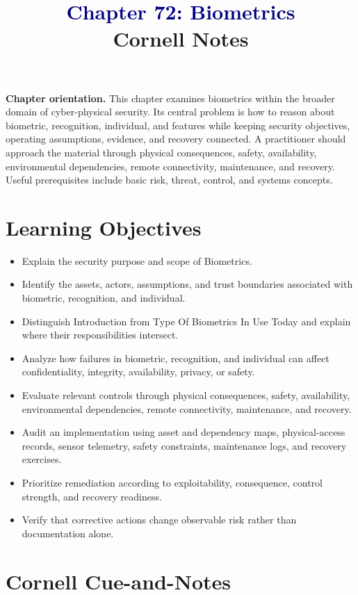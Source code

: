\documentclass[11pt]{article}
\title{\textcolor{Navy}{Chapter 72: Biometrics}\\[2mm]\large Cornell Notes}
\author{}
\date{}
\begin{document}
\maketitle
\thispagestyle{fancy}
\vspace{-1.5em}
\begin{orientationbox}
\textbf{Chapter orientation.} This chapter examines biometrics within the broader domain of cyber-physical security. Its central problem is how to reason about biometric, recognition, individual, and features while keeping security objectives, operating assumptions, evidence, and recovery connected. A practitioner should approach the material through physical consequences, safety, availability, environmental dependencies, remote connectivity, maintenance, and recovery. Useful prerequisites include basic risk, threat, control, and systems concepts.
\end{orientationbox}
\section*{Learning Objectives}
\begin{itemize}
\item Explain the security purpose and scope of Biometrics.
\item Identify the assets, actors, assumptions, and trust boundaries associated with biometric, recognition, and individual.
\item Distinguish Introduction from Type Of Biometrics In Use Today and explain where their responsibilities intersect.
\item Analyze how failures in biometric, recognition, and individual can affect confidentiality, integrity, availability, privacy, or safety.
\item Evaluate relevant controls through physical consequences, safety, availability, environmental dependencies, remote connectivity, maintenance, and recovery.
\item Audit an implementation using asset and dependency maps, physical-access records, sensor telemetry, safety constraints, maintenance logs, and recovery exercises.
\item Prioritize remediation according to exploitability, consequence, control strength, and recovery readiness.
\item Verify that corrective actions change observable risk rather than documentation alone.
\end{itemize}
\section*{Cornell Cue-and-Notes}
\end{document}
